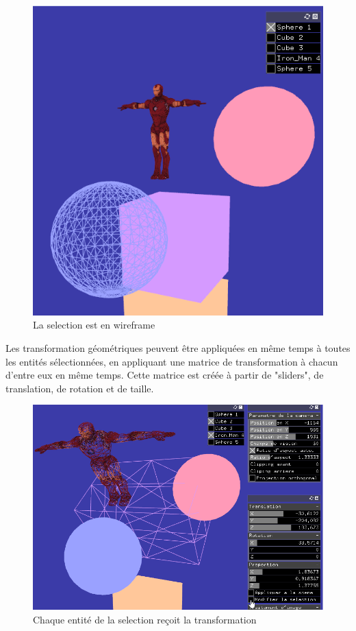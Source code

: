\begin{figure}[h]
	\centering
	\includegraphics[width=12cm]{fig/WireframeSelection.png}
	\caption{La selection est en wireframe}
	\label{fig:test}
\end{figure}

\newpage

Les transformation géométriques peuvent être appliquées en même temps à toutes les entités sélectionnées, en appliquant une matrice de transformation à chacun d'entre eux en même temps. Cette matrice est créée à partir de "sliders", de translation, de rotation et de taille.

\begin{figure}[h]
	\centering
	\includegraphics[width=18cm]{fig/transformationSelection.png}
	\caption{Chaque entité de la selection reçoit la transformation}
	\label{fig:test}
\end{figure}

